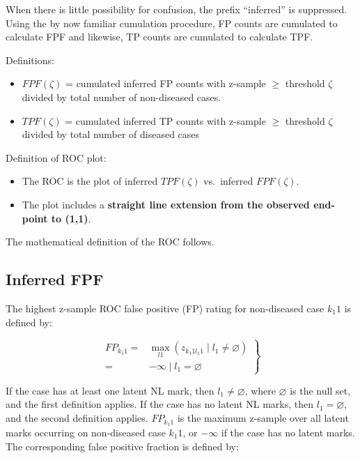 \documentclass[
]{book}
\providecommand{\tightlist}{%
  \setlength{\itemsep}{0pt}\setlength{\parskip}{0pt}}
\begin{document}
When there is little possibility for confusion, the prefix ``inferred'' is suppressed. Using the by now familiar cumulation procedure, FP counts are cumulated to calculate FPF and likewise, TP counts are cumulated to calculate TPF.

Definitions:

\begin{itemize}
\tightlist
\item
  \(FPF(\zeta)\) = cumulated inferred FP counts with z-sample \(\geq\) threshold \(\zeta\) divided by total number of non-diseased cases.
\item
  \(TPF(\zeta)\) = cumulated inferred TP counts with z-sample \(\geq\) threshold \(\zeta\) divided by total number of diseased cases
\end{itemize}

Definition of ROC plot:

\begin{itemize}
\tightlist
\item
  The ROC is the plot of inferred \(TPF(\zeta)\) vs.~inferred \(FPF(\zeta)\).
\item
  The plot includes a \textbf{straight line extension from the observed end-point to (1,1)}.
\end{itemize}

The mathematical definition of the ROC follows.

\hypertarget{inferred-fpf}{%
\subsection{Inferred FPF}\label{inferred-fpf}}

The highest z-sample ROC false positive (FP) rating for non-diseased case \(k_1 1\) is defined by:

\begin{equation}
\left.
\begin{aligned}
FP_{k_1 1}=&\max_{l1} \left ( z_{k_1 1 l_1 1 } \mid l_1 \neq \varnothing \right ) \\
=& -\infty \mid l_1 = \varnothing  
 \end{aligned}
\right \}
\label{eq:froc-empirical-FP}
\end{equation}

If the case has at least one latent NL mark, then \(l_1 \neq \varnothing\), where \(\varnothing\) is the null set, and the first definition applies. If the case has no latent NL marks, then \(l_1 = \varnothing\), and the second definition applies. \(FP_{k_1 1}\) is the maximum z-sample over all latent marks occurring on non-diseased case \(k_1 1\), or \(-\infty\) if the case has no latent marks. The corresponding false positive fraction is defined by:
\end{document}
